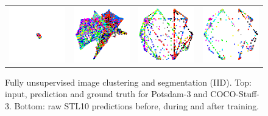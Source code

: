 \begin{figure}[t]
\begin{tabular}{c c c c c c c c c c c c}
\multicolumn{3}{c}{
\includegraphics[height=0.20\textwidth]{experiments2_files/556_pointcloud_random.png}} & 
\multicolumn{3}{c}{
\includegraphics[height=0.20\textwidth]{experiments2_files/556_pointcloud_e_3.png}} & 
\multicolumn{3}{c}{
\includegraphics[height=0.20\textwidth]{experiments2_files/556_pointcloud_e_24.png}} &
\multicolumn{3}{c}{
\includegraphics[height=0.20\textwidth]{experiments2_files/247_pointcloud_best.png}}\\

\end{tabular}
\egroup
\caption{\label{f:splash} Fully unsupervised image clustering and segmentation (IID). Top: input, prediction and ground truth for Potsdam-3 and COCO-Stuff-3. Bottom: raw STL10 predictions before, during and after training.}
\end{figure}